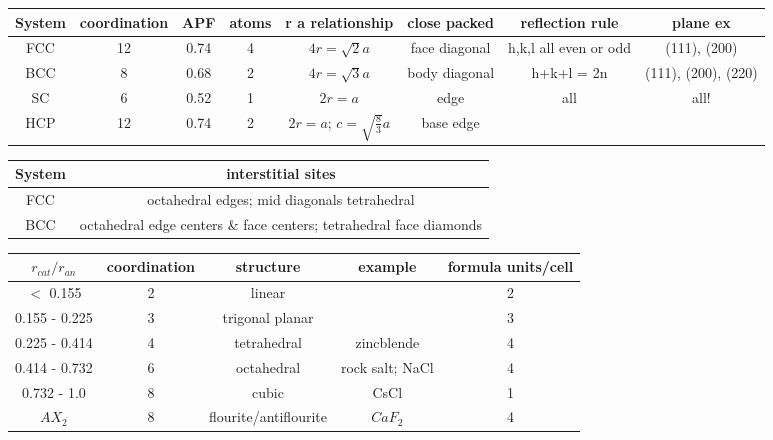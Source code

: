 \documentclass{article}
\begin{document}
\begin{table}[H]
    \centering
    \begin{tabular}{ c | c c c c c c c}
        System & coordination & APF &  atoms & r a relationship  & close packed & reflection rule & plane ex \\
        \hline
        FCC & 12 & 0.74 & 4 & $4r =\sqrt{2}a$ & face diagonal & h,k,l all even or odd & (111), (200)  \\
        BCC & 8 & 0.68 & 2 & $4r = \sqrt{3}a$ & body diagonal & h+k+l = 2n & (111), (200), (220) \\
        SC & 6 & 0.52 & 1 & $2r = a$ & edge & all & all! \\
        HCP & 12 & 0.74 & 2 & $2r = a$; $c = \sqrt{\frac{8}{3}} a$ & base edge & & \\
    \end{tabular}



    \vspace{1em}

    \begin{tabular}{c c}
        System & interstitial sites \\ 
        \hline
        FCC &  octahedral edges; mid diagonals tetrahedral \\
        BCC & octahedral edge centers \& face centers; tetrahedral face diamonds \\
    \end{tabular}
\end{table}

\begin{table}[H]
    \centering
    \begin{tabular}{ c | c c c c }
        $r_{cat} / r_{an}$ & coordination & structure & example & formula units/cell \\
        \hline
        $<$ 0.155 & 2 & linear &  & 2 \\
        0.155 - 0.225 & 3 & trigonal planar &  & 3 \\
        0.225 - 0.414 & 4 & tetrahedral & zincblende & 4 \\
        0.414 - 0.732 & 6 & octahedral & rock salt; NaCl & 4 \\
        0.732 - 1.0 & 8 & cubic & CsCl & 1 \\
        $AX_2$ & 8 & flourite/antiflourite & $CaF_2$ & 4 \\
    \end{tabular}
\end{table}
\end{document}
